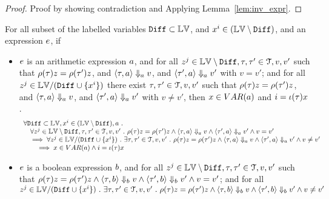 	\begin{proof}
		Proof by showing contradiction and Applying Lemma~\ref{lem:inv_expr}.
	\end{proof}
\begin{lem}
	\label{lem:inv_expr_gnl_II}
	For all subset of the labelled variables $\mathtt{Diff} \subset \mathbb{LV}$, and $x^i \in (\mathbb{LV} \setminus \mathtt{Diff})$,
	and an expression $e$, if 
	\begin{itemize}
		\item $e$ is an arithmetic expression $a$,
		and for all $z^j \in \mathbb{LV} \setminus \mathtt{Diff}, \mathtt{\tau}, \mathtt{\tau}' \in \mathcal{T}, v, v'$ such that 
		$\rho(\mathtt{\tau}) z = \rho(\mathtt{\tau}') z$, and 
		$
		\langle \mathtt{\tau}, a \rangle \Downarrow_a v$, and $\langle \mathtt{\tau}', a \rangle \Downarrow_a v'$ with $v = v'$;
		and for all $z^j \in \mathbb{LV} / (\mathtt{Diff} \cup \{x^i\} )$ 
		there exist $\mathtt{\tau}, \mathtt{\tau}' \in \mathcal{T}, v, v'$ such that 
		$\rho(\mathtt{\tau}) z = \rho(\mathtt{\tau}') z$, and 
		$
		\langle \mathtt{\tau}, a \rangle \Downarrow_a v$, and $\langle \mathtt{\tau}', a \rangle \Downarrow_a v'$ with $v \neq v'$,
		then $x \in VAR(a)$ and $i = \iota(\mathtt{\tau}) x$.
		\[
			\begin{array}{l}
			\forall \mathtt{Diff} \subset \mathbb{LV},  x^i \in (\mathbb{LV} \setminus \mathtt{Diff}), a ~.~
			\\ \quad
			\forall z^j \in \mathbb{LV} \setminus \mathtt{Diff}, \mathtt{\tau}, \mathtt{\tau}' \in \mathcal{T}, v, v' ~.~ 
			\rho(\mathtt{\tau}) z = \rho(\mathtt{\tau}') z \land 
			\langle \mathtt{\tau}, a \rangle \Downarrow_a v \land \langle \mathtt{\tau}', a \rangle \Downarrow_a v' \land v = v'
			\\ \quad
			\implies 
			\forall z^j \in \mathbb{LV} / (\mathtt{Diff} \cup \{x^i\} ) ~.~ 
			\exists \mathtt{\tau}, \mathtt{\tau}' \in \mathcal{T}, v, v'~.~ 
			\rho(\mathtt{\tau}) z = \rho(\mathtt{\tau}') z \land 
			\langle \mathtt{\tau}, a \rangle \Downarrow_a v \land \langle \mathtt{\tau}', a \rangle \Downarrow_a v' \land v \neq v'
			\\ \qquad
			\implies x \in VAR(a) \land i = \iota(\mathtt{\tau}) x
			\end{array}
		\]
	\item $e$ is a boolean expression $b$,
	and for all $ z^j \in \mathbb{LV} \setminus \mathtt{Diff}, \mathtt{\tau}, \mathtt{\tau}' \in \mathcal{T}, v, v'$ such that 
	$ \rho(\mathtt{\tau}) z = \rho(\mathtt{\tau}') z \land 
	\langle \mathtt{\tau}, b \rangle \Downarrow_b v \land \langle \mathtt{\tau}', b \rangle \Downarrow_b v' \land v = v'$;
	and for all
	$ z^j \in \mathbb{LV} / (\mathtt{Diff} \cup \{x^i\} ) ~.~ 
	 \exists \mathtt{\tau}, \mathtt{\tau}' \in \mathcal{T}, v, v'~.~ 
	\rho(\mathtt{\tau}) z = \rho(\mathtt{\tau}') z \land 
	\langle \mathtt{\tau}, b \rangle \Downarrow_b v \land \langle \mathtt{\tau}', b \rangle \Downarrow_b v' \land v \neq v'$

\end{itemize}
\end{lem}

